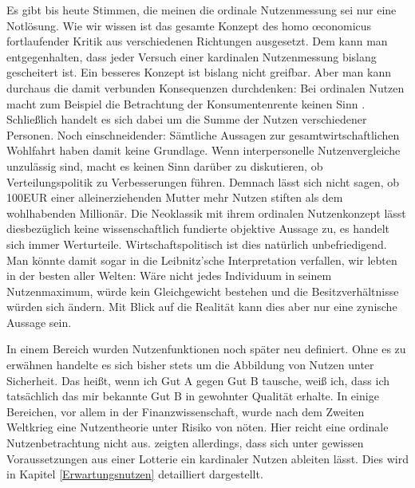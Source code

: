 Es gibt bis heute Stimmen, die meinen die ordinale Nutzenmessung sei nur eine Notlösung. Wie wir wissen ist das gesamte Konzept des homo \oe conomicus fortlaufender Kritik aus verschiedenen Richtungen ausgesetzt. Dem kann man entgegenhalten, dass jeder Versuch einer kardinalen Nutzenmessung bislang gescheitert ist. Ein besseres Konzept ist bislang nicht greifbar. Aber man kann durchaus die damit verbunden Konsequenzen durchdenken: Bei ordinalen Nutzen macht zum Beispiel die Betrachtung der Konsumentenrente keinen Sinn \parencite[S: 400]{Rosner2012}. Schließlich handelt es sich dabei um die Summe der Nutzen verschiedener Personen. Noch einschneidender: Sämtliche Aussagen zur gesamtwirtschaftlichen Wohlfahrt haben damit keine Grundlage. Wenn interpersonelle Nutzenvergleiche unzulässig sind, macht es keinen Sinn darüber zu diskutieren, ob Verteilungspolitik zu Verbesserungen führen. Demnach lässt sich nicht sagen, ob 100EUR einer alleinerziehenden Mutter mehr Nutzen stiften als dem wohlhabenden Millionär. Die Neoklassik mit ihrem ordinalen Nutzenkonzept lässt diesbezüglich keine wissenschaftlich fundierte objektive Aussage zu, es handelt sich immer Werturteile. Wirtschaftspolitisch ist dies natürlich unbefriedigend. Man könnte damit sogar in die Leibnitz'sche Interpretation verfallen, wir lebten in der besten aller Welten: Wäre nicht jedes Individuum in seinem Nutzenmaximum, würde kein Gleichgewicht bestehen und die Besitzverhältnisse würden sich ändern. Mit Blick auf die Realität kann dies aber nur eine zynische Aussage sein.

In einem Bereich wurden Nutzenfunktionen noch später neu definiert. Ohne es zu erwähnen handelte es sich bisher stets um die Abbildung von Nutzen unter Sicherheit. Das heißt, wenn ich Gut A gegen Gut B tausche, weiß ich, dass ich tatsächlich das mir bekannte Gut B in gewohnter Qualität erhalte. In einige Bereichen, vor allem in der Finanzwissenschaft, wurde nach dem Zweiten Weltkrieg eine Nutzentheorie unter Risiko von nöten. Hier reicht eine ordinale Nutzenbetrachtung nicht aus. \textcite{VonNeumann1944} zeigten allerdings, dass sich unter gewissen Voraussetzungen aus einer Lotterie ein kardinaler Nutzen ableiten lässt. Dies wird in Kapitel \ref{Erwartungsnutzen} detailliert dargestellt.


